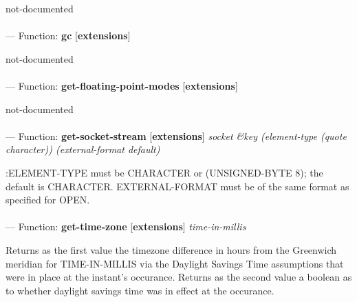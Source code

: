 \begin{adjustwidth}{5em}{5em}
not-documented
\end{adjustwidth}

\paragraph{}
\label{EXTENSIONS:GC}
--- Function: \textbf{gc} [\textbf{extensions}] \textit{}

\begin{adjustwidth}{5em}{5em}
not-documented
\end{adjustwidth}

\paragraph{}
\label{EXTENSIONS:GET-FLOATING-POINT-MODES}
--- Function: \textbf{get-floating-point-modes} [\textbf{extensions}] \textit{}

\begin{adjustwidth}{5em}{5em}
not-documented
\end{adjustwidth}

\paragraph{}
\label{EXTENSIONS:GET-SOCKET-STREAM}
--- Function: \textbf{get-socket-stream} [\textbf{extensions}] \textit{socket \&key (element-type (quote character)) (external-format default)}

\begin{adjustwidth}{5em}{5em}
:ELEMENT-TYPE must be CHARACTER or (UNSIGNED-BYTE 8); the default is CHARACTER.
EXTERNAL-FORMAT must be of the same format as specified for OPEN.
\end{adjustwidth}

\paragraph{}
\label{EXTENSIONS:GET-TIME-ZONE}
--- Function: \textbf{get-time-zone} [\textbf{extensions}] \textit{time-in-millis}

\begin{adjustwidth}{5em}{5em}
Returns as the first value the timezone difference in hours from the Greenwich meridian for TIME-IN-MILLIS via the Daylight Savings Time assumptions that were in place at the instant's occurance.  Returns as the second value a boolean as to whether daylight savings time was in effect at the occurance.
\end{adjustwidth}


